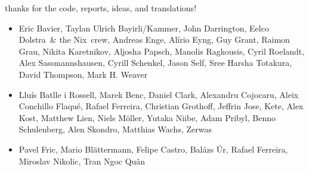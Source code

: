 \documentclass{beamer}
\begin{document}
\begin{frame}[plain]

\end{frame}

\begin{frame}{thanks for the code, reports, ideas, and translations!}

  \begin{itemize}
    \item Eric Bavier, Taylan Ulrich Bayirli/Kammer, John Darrington,
      Eelco Dolstra~\& the Nix~crew, Andreas Enge, Alírio Eyng, Guy
      Grant, Raimon Grau, Nikita Karetnikov, Aljosha Papsch, Manolis
      Ragkousis, Cyril Roelandt, Alex Sassmannshausen, Cyrill Schenkel,
      Jason Self, Sree Harsha Totakura, David Thompson, Mark H. Weaver
    \item Lluís Batlle i Rossell, Marek Benc, Daniel
      Clark, Alexandru Cojocaru, Aleix Conchillo Flaqué, Rafael
      Ferreira, Christian Grothoff, Jeffrin Jose, Kete, Alex Kost,
      Matthew Lien, Niels Möller, Yutaka Niibe, Adam Pribyl, Benno
      Schulenberg, Alen Skondro, Matthias Wachs, Zerwas
    \item Pavel Fric, Mario Blättermann, Felipe Castro, Balázs Úr,
      Rafael Ferreira, Miroslav Nikolic, Tran Ngoc Quân
  \end{itemize}
\end{frame}
\end{document}
